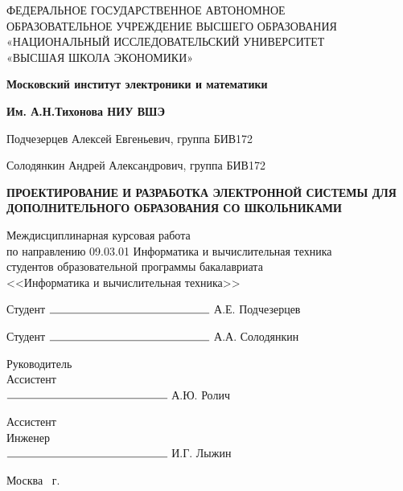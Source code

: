 \begin{titlepage}
	\begin{center}
		ФЕДЕРАЛЬНОЕ  ГОСУДАРСТВЕННОЕ АВТОНОМНОЕ \\
		ОБРАЗОВАТЕЛЬНОЕ УЧРЕЖДЕНИЕ ВЫСШЕГО ОБРАЗОВАНИЯ\\
		«НАЦИОНАЛЬНЫЙ ИССЛЕДОВАТЕЛЬСКИЙ УНИВЕРСИТЕТ\\
		«ВЫСШАЯ ШКОЛА ЭКОНОМИКИ»
	\end{center}
	
	\begin{center}
		\textbf{Московский институт электроники и математики}
		
		\textbf{Им. А.Н.Тихонова НИУ ВШЭ}
	\end{center}
	\vspace{1ex}	
	\begin{center}
		Подчезерцев Алексей Евгеньевич, группа БИВ172
		
		Солодянкин Андрей Александрович, группа БИВ172
	\end{center}	
	\vspace{1ex}
	\begin{center}
		\textbf{ПРОЕКТИРОВАНИЕ И РАЗРАБОТКА ЭЛЕКТРОННОЙ СИСТЕМЫ ДЛЯ ДОПОЛНИТЕЛЬНОГО ОБРАЗОВАНИЯ СО ШКОЛЬНИКАМИ}
	\end{center}	
	\vspace{2ex}
	\begin{center}
		Междисциплинарная курсовая работа \\
		по направлению 09.03.01 Информатика и вычислительная техника \\
		студентов образовательной программы бакалавриата \\
		<<Информатика и вычислительная техника>> \\

	\end{center}
	\vspace{2ex}
	\begin{flushright}
		Студент $\rule{5cm}{0.15mm}$ А.Е. Подчезерцев 
		
		\vspace{1ex}
		Студент $\rule{5cm}{0.15mm}$ А.А. Солодянкин 
	\end{flushright}
	\vspace{3ex}
	\begin{flushright}
		Руководитель\\
		Ассистент \\
		$\rule{5cm}{0.15mm}$ А.Ю. Ролич
	\end{flushright}
	\begin{flushright}
		Ассистент\\
		Инженер \\
		$\rule{5cm}{0.15mm}$ И.Г. Лыжин
	\end{flushright}
	\vfill
	\begin{center}
		Москва \the\year \, г.
	\end{center}
\end{titlepage}